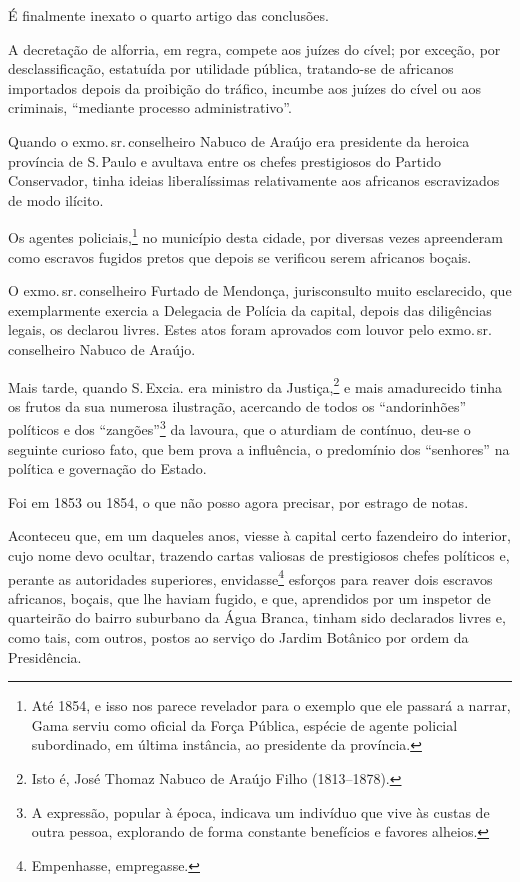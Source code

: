{É finalmente inexato o quarto artigo das conclusões.

A decretação de alforria, em regra, compete aos juízes do cível; por
exceção, por desclassificação, estatuída por utilidade pública,
tratando-se de africanos importados depois da proibição do tráfico,
incumbe aos juízes do cível ou aos criminais, ``mediante processo
administrativo''.

Quando o exmo.\,sr.\,conselheiro Nabuco de Araújo era presidente da
heroica província de S.\,Paulo e avultava entre os chefes prestigiosos do
Partido Conservador, tinha ideias liberalíssimas relativamente aos
africanos escravizados de modo ilícito.

Os agentes policiais,\footnote{Até 1854, e isso nos parece revelador
  para o exemplo que ele passará a narrar, Gama serviu como oficial da
  Força Pública, espécie de agente policial subordinado, em última
  instância, ao presidente da província.} no município desta cidade,
por diversas vezes apreenderam como escravos fugidos pretos que depois
se verificou serem africanos boçais.

O exmo.\,sr.\,conselheiro Furtado de Mendonça, jurisconsulto muito
esclarecido, que exemplarmente exercia a Delegacia de Polícia da
capital, depois das diligências legais, os declarou livres. Estes atos
foram aprovados com louvor pelo exmo.\,sr.\,conselheiro Nabuco de Araújo.

Mais tarde, quando S.\,Excia. era ministro da Justiça,\footnote{Isto é,
  José Thomaz Nabuco de Araújo Filho (1813--1878).} e mais amadurecido
tinha os frutos da sua numerosa ilustração, acercando de todos os
``andorinhões'' políticos e dos ``zangões''\footnote{A expressão, popular
  à época, indicava um indivíduo que vive às custas de outra pessoa,
  explorando de forma constante benefícios e favores alheios.} da
lavoura, que o aturdiam de contínuo, deu-se o seguinte curioso fato, que
bem prova a influência, o predomínio dos ``senhores'' na política e
governação do Estado.

Foi em 1853 ou 1854, o que não posso agora precisar, por estrago de
notas.

Aconteceu que, em um daqueles anos, viesse à capital certo fazendeiro do
interior, cujo nome devo ocultar, trazendo cartas valiosas de
prestigiosos chefes políticos e, perante as autoridades superiores,
envidasse\footnote{Empenhasse, empregasse.} esforços para reaver dois
escravos africanos, boçais, que lhe haviam fugido, e que, aprendidos por
um inspetor de quarteirão do bairro suburbano da Água Branca, tinham
sido declarados livres e, como tais, com outros, postos ao serviço do
Jardim Botânico por ordem da Presidência.

}
